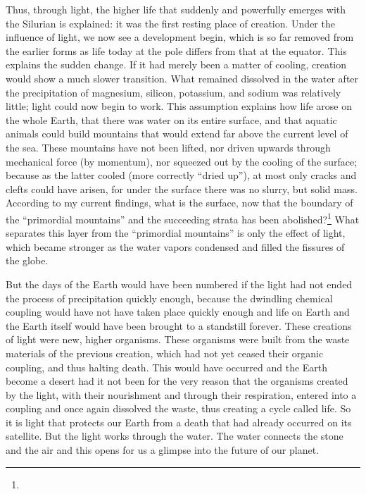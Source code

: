 \documentclass[a4paper, 12pt, oneside]{article}
\begin{document}
Thus, through light, the higher life that suddenly and powerfully emerges with the Silurian is explained: it was the first resting place of creation. Under the influence of light, we now see a development begin, which is so far removed from the earlier forms as life today at the pole differs from that at the equator. This explains the sudden change. If it had merely been a matter of cooling, creation would show a much slower transition. What remained dissolved in the water after the precipitation of magnesium, silicon, potassium, and sodium was relatively little; light could now begin to work. This assumption explains how life arose on the whole Earth, that there was water on its entire surface, and that aquatic animals could build mountains that would extend far above the current level of the sea. These mountains have not been lifted, nor driven upwards through mechanical force (by momentum), nor squeezed out by the cooling of the surface; because as the latter cooled (more correctly ``dried up''), at most only cracks and clefts could have arisen, for under the surface there was no slurry, but solid mass. According to my current findings, what is the surface, now that the boundary of the ``primordial mountains'' and the succeeding strata has been abolished?\footnote{} What separates this layer from the ``primordial mountains'' is only the effect of light, which became stronger as the water vapors condensed and filled the fissures of the globe.

But the days of the Earth would have been numbered if the light had not ended the process of precipitation quickly enough, because the dwindling chemical coupling would have not have taken place quickly enough and life on Earth and the Earth itself would have been brought to a standstill forever. These creations of light were new, higher organisms. These organisms were built from the waste materials of the previous creation, which had not yet ceased their organic coupling, and thus halting death. This would have occurred and the Earth become a desert had it not been for the very reason that the organisms created by the light, with their nourishment and through their respiration, entered into a coupling and once again dissolved the waste, thus creating a cycle called life. So it is light that protects our Earth from a death that had already occurred on its satellite. But the light works through the water. The water connects the stone and the air and this opens for us a glimpse into the future of our planet.
\clearpage
\end{document}
